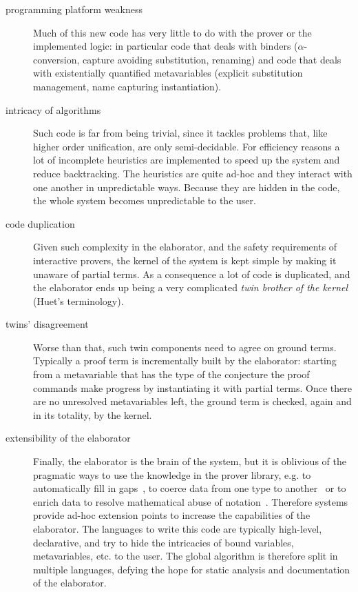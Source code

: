 \documentclass{easychair}
\begin{document}
\begin{description}
\item[programming platform weakness]
Much of this new code has very little to do with the prover or the implemented
logic: in particular code that deals with binders ($\alpha$-conversion,
capture avoiding substitution, renaming) and code that deals with existentially
quantified metavariables (explicit substitution management, name capturing
instantiation).
\item[intricacy of algorithms]
Such code is far from being trivial, since it tackles problems that, like
higher order unification, are only semi-decidable. For efficiency reasons a lot
of incomplete heuristics are implemented to speed up the system and reduce
backtracking. The heuristics are quite ad-hoc and they interact with
one another in unpredictable ways. Because they are hidden in the code, the
whole system becomes unpredictable to the user.
\item[code duplication]
Given such complexity in the elaborator, and the safety requirements of interactive provers, the kernel of the system is kept simple by making it unaware of partial terms.  As a consequence a lot of code is duplicated, and
the elaborator ends up being a very complicated \emph{twin brother of the
kernel} (Huet's terminology).
\item[twins' disagreement]
Worse than that, such twin components need to agree on ground terms.
Typically a proof term is incrementally built by the elaborator:
starting from a metavariable that has the type of
the conjecture the proof commands make progress by instantiating it
with partial terms.  Once there are no unresolved metavariables left,
the ground term is checked, again and in its totality, by the kernel.
\item[extensibility of the elaborator]
Finally, the elaborator is the brain of the system, but it is oblivious of the
pragmatic ways to use the knowledge in the prover library, e.g.  to
automatically fill in gaps~\cite{oothm,unificationhints}, to coerce data from one type
to another~\cite{coercivesubtyping} or to enrich data to resolve mathematical
abuse of notation~\cite{nonuniformcoercions}. Therefore systems provide
ad-hoc extension points to increase the capabilities of the elaborator.  The
languages to write this code are typically high-level, declarative, and
try to hide the intricacies of bound variables, metavariables, etc. to the user.
The global algorithm is therefore split in multiple languages, defying the hope
for static analysis and documentation of the elaborator.
\end{description}
\end{document}
